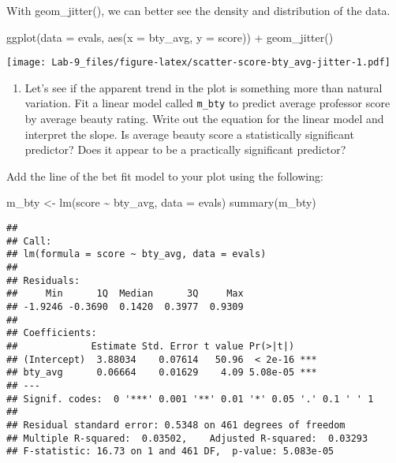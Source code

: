 \documentclass[
]{article}
\newenvironment{Shaded}{\begin{snugshade}}{\end{snugshade}}
\newcommand{\AttributeTok}[1]{\textcolor[rgb]{0.77,0.63,0.00}{#1}}
\newcommand{\FunctionTok}[1]{\textcolor[rgb]{0.00,0.00,0.00}{#1}}
\newcommand{\NormalTok}[1]{#1}
\newcommand{\OtherTok}[1]{\textcolor[rgb]{0.56,0.35,0.01}{#1}}
\newcommand{\SpecialCharTok}[1]{\textcolor[rgb]{0.00,0.00,0.00}{#1}}
\providecommand{\tightlist}{%
  \setlength{\itemsep}{0pt}\setlength{\parskip}{0pt}}
\begin{document}
With geom\_jitter(), we can better see the density and distribution of
the data.

\begin{Shaded}
\begin{Highlighting}[]
\FunctionTok{ggplot}\NormalTok{(}\AttributeTok{data =}\NormalTok{ evals, }\FunctionTok{aes}\NormalTok{(}\AttributeTok{x =}\NormalTok{ bty\_avg, }\AttributeTok{y =}\NormalTok{ score)) }\SpecialCharTok{+} \FunctionTok{geom\_jitter}\NormalTok{()}
\end{Highlighting}
\end{Shaded}

\texttt{[image: Lab-9\_files/figure-latex/scatter-score-bty\_avg-jitter-1.pdf]}

\begin{enumerate}
\def\labelenumi{\arabic{enumi}.}
\setcounter{enumi}{4}
\tightlist
\item
  Let's see if the apparent trend in the plot is something more than
  natural variation. Fit a linear model called \texttt{m\_bty} to
  predict average professor score by average beauty rating. Write out
  the equation for the linear model and interpret the slope. Is average
  beauty score a statistically significant predictor? Does it appear to
  be a practically significant predictor?
\end{enumerate}

Add the line of the bet fit model to your plot using the following:

\begin{Shaded}
\begin{Highlighting}[]
\NormalTok{m\_bty }\OtherTok{\textless{}{-}} \FunctionTok{lm}\NormalTok{(score }\SpecialCharTok{\textasciitilde{}}\NormalTok{ bty\_avg, }\AttributeTok{data =}\NormalTok{ evals)}
\FunctionTok{summary}\NormalTok{(m\_bty)}
\end{Highlighting}
\end{Shaded}

\begin{verbatim}
## 
## Call:
## lm(formula = score ~ bty_avg, data = evals)
## 
## Residuals:
##     Min      1Q  Median      3Q     Max 
## -1.9246 -0.3690  0.1420  0.3977  0.9309 
## 
## Coefficients:
##             Estimate Std. Error t value Pr(>|t|)    
## (Intercept)  3.88034    0.07614   50.96  < 2e-16 ***
## bty_avg      0.06664    0.01629    4.09 5.08e-05 ***
## ---
## Signif. codes:  0 '***' 0.001 '**' 0.01 '*' 0.05 '.' 0.1 ' ' 1
## 
## Residual standard error: 0.5348 on 461 degrees of freedom
## Multiple R-squared:  0.03502,    Adjusted R-squared:  0.03293 
## F-statistic: 16.73 on 1 and 461 DF,  p-value: 5.083e-05
\end{verbatim}
\end{document}
